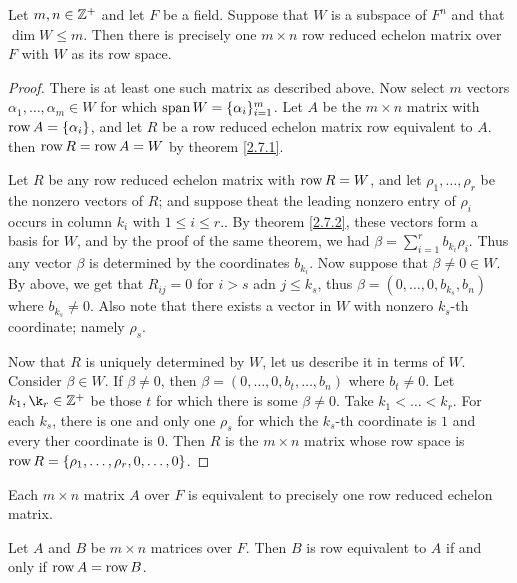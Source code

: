 \begin{theorem}\label{2.7.3}
    Let $m,n \in \mathbb{Z}^+$ and let  $F$ be a field. Suppose that 
    $W$ is a subspace of  $F^n$ and that  $\dim{W} \leq m$. 
    Then there is precisely one $m \times n$ row reduced 
    echelon matrix over  $F$ with $W$ as its row space.
\end{theorem}
\begin{proof}
    There is at least one such matrix as described above. Now 
    select $m$ vectors  $\alpha_1, \dots, \alpha_m \in W$ for 
    which $\operatorname{span}{W}=\{\alpha_i\}_{i=1}^m$. Let $A$ be the $m 
    \times n$ matrix with  $\operatorname{row}{A}=\{\alpha_i\}$, and let $R$
    be a row reduced echelon matrix row equivalent to  $A$. 
    then  $\operatorname{row}{R}=\operatorname{row}{A}=W$ by theorem \ref{2.7.1}. 

    Let $R$ be any row reduced echelon matrix with  $\operatorname{row}{R} 
    =W$, and let $\rho_1, \dots, \rho_r$ be the nonzero 
    vectors of $R$; and suppose theat the leading nonzero 
    entry of $\rho_i$ occurs in column  $k_i$ with  $1 \leq i \leq r.$. By
    theorem \ref {2.7.2}, these vectors form a basis for $W$, and by the proof
    of the same theorem, we had  $\beta=\sum_{i=1}^{r}{b_{k_i}\rho_i}$. Thus any
    vector $\beta$ is determined by the coordinates  $b_{k_i}$. Now suppose that
    $\beta \neq 0 \in W$. By above, we get that  $R_{ij}=0$ for $i>s$ adn  $j
    \leq k_s$, thus  $\beta=(0, \dots, 0, b_{k_s}, b_n)$ where $b_{k_s} \neq 0$.
    Also note that there exists a vector in $W$ with nonzero  $k_s$-th
    coordinate; namely  $\rho_s$.

    Now that  $R$ is uniquely determined by  $W$, let us describe it in terms of
    $W$.  Consider  $\beta \in W$. If  $\beta \neq 0$, then  $\beta=(0, \dots,
    0,b_t, \dots, b_n)$ where $b_t \neq 0$. Let  $k_1, \k_r \in \Z^+$ be those
    $t$ for which there is some  $\beta \neq 0$. Take  $k_1< \dots<k_r$. For
    each $k_s$, there is one and only one  $\rho_s$ for which the  $k_s$-th
    coordinate is $1$ and every ther coordinate is $0$. Then  $R$ is the  $m
    \times n$ matrix whose row space is  $\operatorname{row}{R}=\{\rho_1, \dots, \rho_r,0,
    \dots, 0\}$.
\end{proof}
\begin{corollary}
    Each $m \times n$ matrix $A$ over $F$ is equivalent to precisely one row
    reduced echelon matrix.
\end{corollary}
\begin{corollary}
    Let $A$ and  $B$ be $m \times n$ matrices over  $F$. Then  $B$ is row
    equivalent to  $A$ if and only if  $\operatorname{row}{A}=\operatorname{row}{B}$. 
\end{corollary}

